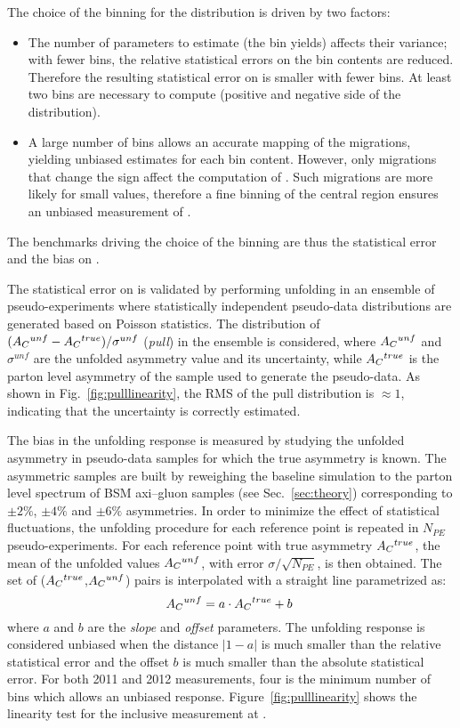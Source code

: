 The choice of the binning for the \dy{} distribution is driven by two
factors:
\begin{itemize}
\item The number of parameters to estimate (the \dy{} bin yields)
  affects their variance; with fewer bins, the relative statistical
  errors on the bin contents are reduced. Therefore the resulting
  statistical error on \ac{} is smaller with fewer bins. At least two
  bins are necessary to compute \ac{} (positive and negative side of
  the \dy{} distribution).
\item A large number of bins allows an accurate mapping of the
  migrations, yielding unbiased estimates for each bin
  content. However, only migrations that change the \dy{} sign affect
  the computation of \ac{}. Such migrations are more likely for small
  \dy{} values, therefore a fine binning of the central \dy{} region
  ensures an unbiased measurement of \ac{}. 
\end{itemize}
The benchmarks driving the choice of the binning are thus the
statistical error and the bias on \ac{}.

The statistical error on \ac{} is validated by performing unfolding in
an ensemble of pseudo-experiments where statistically independent
pseudo-data distributions are generated based on Poisson statistics.  
The distribution of $(\mbox{$A_C$}{}^{unf}-\mbox{$A_C$}{}^{true})/\sigma^{unf}$
({\it pull}) in the ensemble is considered, where $\mbox{$A_C$}{}^{unf}$ and
$\sigma^{unf}$ are the unfolded asymmetry value and its uncertainty,
while $\mbox{$A_C$}{}^{true}$ is the parton level asymmetry of the sample used
to generate the pseudo-data. As shown in Fig.~\ref{fig:pulllinearity}, the
RMS of the pull distribution is $\approx{}1$, indicating that the
uncertainty is correctly estimated.  

The bias in the unfolding response is measured by studying the
unfolded asymmetry in pseudo-data samples for which the true
asymmetry is known. The asymmetric samples are built by reweighing the
baseline \ttbar{} simulation to the parton level \dy{} spectrum of BSM axi--gluon
samples (see Sec.~\ref{sec:theory}) corresponding to $\pm2\%$, $\pm4\%$
and $\pm6\%$ asymmetries. In order to minimize the effect of
statistical fluctuations, the unfolding procedure for each reference
point is repeated in $N_{PE}$ pseudo-experiments. For each reference
point with true asymmetry $\mbox{$A_C$}{}^{true}$, the mean of the unfolded
values $\mbox{$A_C$}{}^{unf}$, with error $\sigma/\sqrt{N_{PE}}$, is then
obtained. The set of ($\mbox{$A_C$}{}^{true}$,$\mbox{$A_C$}{}^{unf}$) pairs is
interpolated with a straight line parametrized as: 
\begin{equation}
\mbox{$A_C$}{}^{unf}=a\cdot{}\mbox{$A_C$}{}^{true}+b\phantom{,}
\end{equation}
where $a$ and $b$ are the {\it slope} and {\it offset} parameters.
The unfolding response is considered unbiased when the distance
$|1-a|$ is much smaller than the relative statistical error and the
offset $b$ is much smaller than the absolute statistical error.
For both 2011 and 2012 measurements, four is the minimum number of
bins which allows an unbiased response. Figure~\ref{fig:pulllinearity}
shows the linearity test for the inclusive \ac{} measurement at
\eighttev{}.

